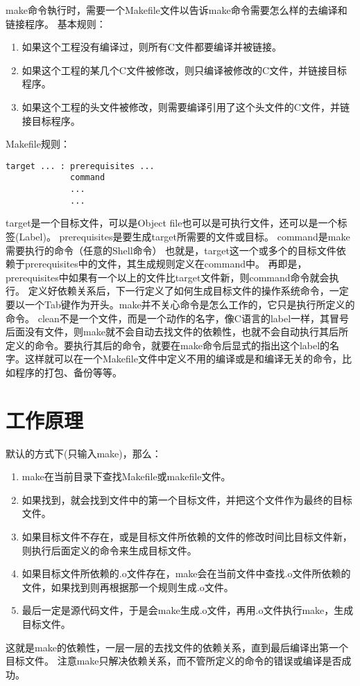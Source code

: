 \documentclass{article}
\begin{document}
make命令執行时，需要一个Makefile文件以告诉make命令需要怎么样的去编译和链接程序。
基本规则：
\begin{enumerate}
	\item  如果这个工程没有编译过，则所有C文件都要编译并被链接。
	\item  如果这个工程的某几个C文件被修改，则只编译被修改的C文件，并链接目标程序。
	\item  如果这个工程的头文件被修改，则需要编译引用了这个头文件的C文件，并链接目标程序。
\end{enumerate}
Makefile规则：
\begin{verbatim}
target ... : prerequisites ...
             command
             ...
             ...			
\end{verbatim}
target是一个目标文件，可以是Object file也可以是可执行文件，还可以是一个标签(Label)。
prerequisites是要生成target所需要的文件或目标。
command是make需要执行的命令（任意的Shell命令）
也就是，target这一个或多个的目标文件依赖于prerequisites中的文件，其生成规则定义在command中。
再即是，prerequisites中如果有一个以上的文件比target文件新，则command命令就会执行。
定义好依赖关系后，下一行定义了如何生成目标文件的操作系统命令，一定要以一个Tab键作为开头。make并不关心命令是怎么工作的，它只是执行所定义的命令。
clean不是一个文件，而是一个动作的名字，像C语言的label一样，其冒号后面没有文件，则make就不会自动去找文件的依赖性，也就不会自动执行其后所定义的命令。要执行其后的命令，就要在make命令后显式的指出这个label的名字。这样就可以在一个Makefile文件中定义不用的编译或是和编译无关的命令，比如程序的打包、备份等等。

\section{工作原理}
默认的方式下(只输入make)，那么：
\begin{enumerate}
\item  make在当前目录下查找Makefile或makefile文件。
\item  如果找到，就会找到文件中的第一个目标文件，并把这个文件作为最终的目标文件。
\item  如果目标文件不存在，或是目标文件所依赖的文件的修改时间比目标文件新，则执行后面定义的命令来生成目标文件。
\item  如果目标文件所依赖的.o文件存在，make会在当前文件中查找.o文件所依赖的文件，如果找到则再根据那一个规则生成.o文件。
\item  最后一定是源代码文件，于是会make生成.o文件，再用.o文件执行make，生成目标文件。
\end{enumerate}
这就是make的依赖性，一层一层的去找文件的依赖关系，直到最后编译出第一个目标文件。
注意make只解决依赖关系，而不管所定义的命令的错误或编译是否成功。
\end{document}
